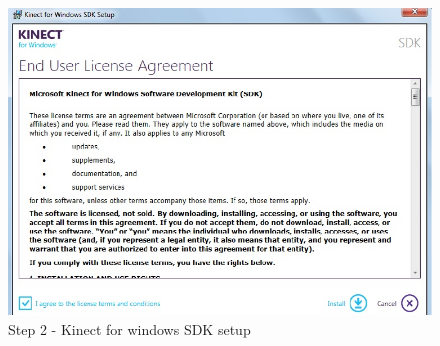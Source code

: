 \begin{flushleft}
\begin{figure}
\begin{center}
\includegraphics[scale=0.7]{sdk_step1}
\end{center}
\caption{Step 2 - Kinect for windows SDK setup}
\label{fig:w3}
\end{figure}


\end{flushleft}
